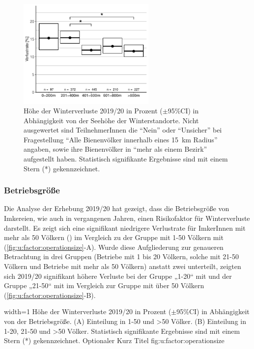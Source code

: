 \begin{figure}[H]
  \centering
  \includegraphics[keepaspectratio,width=0.6\textwidth]{project-U-wintersterblichkeit/figures/plot_elevation}
  \caption{Höhe der Winterverluste 2019/20 in Prozent ($\pm$95\%CI) in Abhängigkeit von der Seehöhe der Winterstandorte. Nicht ausgewertet sind TeilnehmerInnen die \enquote{Nein} oder \enquote{Unsicher} bei Fragestellung \enquote{Alle Bienenvölker innerhalb eines \SI{15}{\kilo\meter} Radius} angaben, sowie ihre Bienenvölker in \enquote{mehr als einem Bezirk} aufgestellt haben. Statistisch signifikante Ergebnisse sind mit einem Stern (*) gekennzeichnet.}
  \label{fig:u:elevation}
\end{figure}

\subsubsection{Betriebsgröße}
\label{ss:betriebsgroesse:U}

Die Analyse der Erhebung 2019/20 hat gezeigt, dass die Betriebsgröße von Imkereien, wie auch in vergangenen Jahren, einen Risikofaktor für Winterverluste darstellt.
\newline
Es zeigt sich eine signifikant niedrigere Verlustrate für ImkerInnen mit mehr als 50 Völkern () im Vergleich zu der Gruppe mit 1-50 Völkern mit  (\cref{fig:u:factor:operationsize}-A). Wurde diese Aufgliederung zur genaueren Betrachtung in drei Gruppen (Betriebe mit 1 bis 20 Völkern, solche mit 21-50 Völkern und Betriebe mit mehr als 50 Völkern) anstatt zwei unterteilt, zeigten sich 2019/20 signifikant höhere Verluste bei der Gruppe „1-20`` mit  und der Gruppe „21-50`` mit  im Vergleich zur Gruppe mit über 50 Völkern (\cref{fig:u:factor:operationsize}-B).

  {width=1\textwidth} %
  {Höhe der Winterverluste 2019/20 in Prozent ($\pm$95\%CI) in Abhängigkeit von der Betriebsgröße. (A) Einteilung in 1-50 und >50 Völker. (B) Einteilung in 1-20, 21-50 und >50 Völker. Statistisch signifikante Ergebnisse sind mit einem Stern (*) gekennzeichnet.} %
  {Optionaler Kurz Titel} %
  {fig:u:factor:operationsize} %

